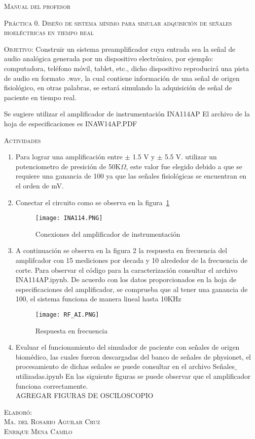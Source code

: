 \documentclass[10pt,letterpaper,spanish,twoside]{report}
\begin{document}
\docdate

\begin{center}
 \textsc{\asignatura}\vspace{.2em}
\end{center}

\textsc{Manual del profesor}

\textsc{Práctica 0. Diseño de sistema mínimo para simular adquisición de señales bioeléctricas en tiempo real}

\textsc{Objetivo:} Construir un sistema preamplificador cuya entrada sea la señal de audio analógica generada por un dispositivo electrónico, por ejemplo: computadora, teléfono móvil, tablet, etc., dicho dispositivo reproducirá una pista de audio en formato .wav, la cual contiene información de una señal de origen fisiológico, en otras palabras, se estará simulando la adquisición de señal de paciente en tiempo real.

Se sugiere utilizar el amplificador de instrumentación INA114AP
\newline El archivo de la hoja de especificaciones es INAW14AP.PDF

\textsc{Actividades}
\begin{enumerate}
 \item Para lograr una amplificación entre $\pm$ 1.5 V y $\pm$ 5.5 V. utilizar un potenciometro de presición de 50K$\Omega$, este valor fue elegido debido a que se requiere una ganancia de 100 ya que las señales fisiológicas se encuentran en el orden de mV.
 \item Conectar el circuito como se observa en la figura~\ref{contexto:INA114}
 \begin{figure}[H]
 	\centering
 	\texttt{[image: INA114.PNG]}
 	\caption{Conexiones del amplificador de instrumentación}
	\label{contexto:INA114}
 \end{figure}
 \item A continuación se observa en la figura 2 la respuesta en frecuencia del amplifcador con 15 mediciones por decada y 10 alrededor de la frecuencia de corte. Para observar el código para la caracterización consultar el archivo INA114AP.ipynb.
 \newline De acuerdo con los datos proporcionados en la hoja de especificaciones del amplificador, se comprueba que al tener una ganancia de 100, el sistema funciona de manera lineal hasta 10KHz
 \begin{figure}[H]
 	\centering
 	\texttt{[image: RF\_AI.PNG]}
 	\caption{Respuesta en frecuencia}
	\label{contexto:figura}
 \end{figure}
 \item Evaluar el funcionamiento del simulador de paciente con señales de origen biomédico, las cuales fueron descargadas del banco de señales de physionet, el procesamiento de dichas señales se puede consultar en el archivo Señales$\_$utilizadas.ipynb 
 \newline En las siguiente figuras se puede observar que el amplificador funciona correctamente.\\AGREGAR FIGURAS DE OSCILOSCOPIO	
\end{enumerate}


\vfill
\begin{flushright}
\textsc{Elaboró:\\
Ma. del Rosario Aguilar Cruz\\
Enrique Mena Camilo}
\end{flushright}
\end{document}
